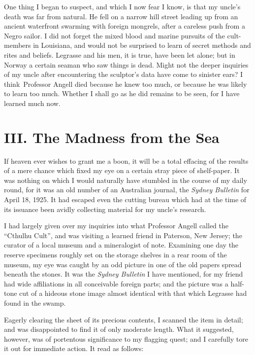 One thing I began to suspect, and which I now fear I know, is that my
uncle's death was far from natural. He fell on a narrow hill street
leading up from an ancient waterfront swarming with foreign mongrels,
after a careless push from a Negro sailor. I did not forget the mixed
blood and marine pursuits of the cult-members in Louisiana, and would
not be surprised to learn of secret methods and rites and beliefs.
Legrasse and his men, it is true, have been let alone; but in Norway a
certain seaman who saw things is dead. Might not the deeper inquiries of
my uncle after encountering the sculptor's data have come to sinister
ears? I think\est\ Professor Angell died because he knew too much, or because
he was likely to learn too much. Whether I shall go as he did remains to
be seen, for I have learned much now.


\chapter*{III. The Madness from the Sea}

If heaven ever wishes to grant me a boon, it will be a total effacing of
the results of a mere chance which fixed my eye on a certain stray piece
of shelf-paper. It was nothing on which I would naturally have stumbled
in the course of my daily round, for it was an old number of an
Australian journal, the \emph{Sydney Bulletin} for April 18, 1925. It had
escaped even the cutting bureau which had at the time of its issuance
been avidly collecting material for my uncle's research.

I had largely given over my inquiries into what Professor Angell called
the ``Cthulhu Cult'', and was visiting a learned friend in Paterson, New
Jersey; the curator of a local museum and a mineralogist of note.
Examining one day the reserve specimens roughly set on the storage
shelves in a rear room of the museum, my eye was caught by an odd
picture in one of the old papers spread beneath the stones. It was the
\emph{Sydney Bulletin} I have mentioned, for my friend had wide affiliations in
all conceivable foreign parts; and the picture was a half-tone cut of a
hideous stone image almost identical with that which Legrasse had found
in the swamp.

Eagerly clearing the sheet of its precious contents, I scanned the item
in detail; and was disappointed to find it of only moderate length. What
it suggested, however, was of portentous significance to my flagging
quest; and I carefully tore it out for immediate action. It read as
follows:

